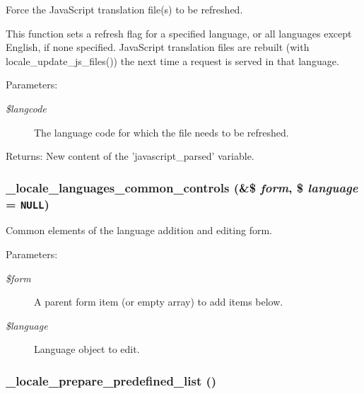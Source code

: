 Force the JavaScript translation file(s) to be refreshed.

This function sets a refresh flag for a specified language, or all languages except English, if none specified. JavaScript translation files are rebuilt (with locale\_\-update\_\-js\_\-files()) the next time a request is served in that language.

\begin{Desc}
\item[Parameters:]
\begin{description}
\item[{\em \$langcode}]The language code for which the file needs to be refreshed. \end{description}
\end{Desc}
\begin{Desc}
\item[Returns:]New content of the 'javascript\_\-parsed' variable. \end{Desc}
\hypertarget{group__locale_ga662af294a8422d2b73e6e05288b1b8d}{
\subsubsection[{\_\-locale\_\-languages\_\-common\_\-controls}]{\setlength{\rightskip}{0pt plus 5cm}\_\-locale\_\-languages\_\-common\_\-controls (\&\$ {\em form}, \/  \$ {\em language} = {\tt NULL})}}
\label{group__locale_ga662af294a8422d2b73e6e05288b1b8d}


Common elements of the language addition and editing form.

\begin{Desc}
\item[Parameters:]
\begin{description}
\item[{\em \$form}]A parent form item (or empty array) to add items below. \item[{\em \$language}]Language object to edit. \end{description}
\end{Desc}
\hypertarget{group__locale_gdf3279a1c940efe6955edc1899a97aad}{
\subsubsection[{\_\-locale\_\-prepare\_\-predefined\_\-list}]{\setlength{\rightskip}{0pt plus 5cm}\_\-locale\_\-prepare\_\-predefined\_\-list ()}}
\label{group__locale_gdf3279a1c940efe6955edc1899a97aad}


